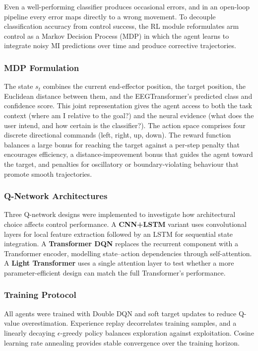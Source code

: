 \documentclass[12pt, a4paper]{article}
\begin{document}
Even a well-performing classifier produces occasional errors, and in an open-loop pipeline every error maps directly to a wrong movement. To decouple classification accuracy from control success, the RL module reformulates arm control as a Markov Decision Process (MDP) in which the agent learns to integrate noisy MI predictions over time and produce corrective trajectories.

\subsubsection{MDP Formulation}

The state $s_t$ combines the current end-effector position, the target position, the Euclidean distance between them, and the EEGTransformer's predicted class and confidence score. This joint representation gives the agent access to both the task context (where am I relative to the goal?) and the neural evidence (what does the user intend, and how certain is the classifier?). The action space comprises four discrete directional commands (left, right, up, down). The reward function balances a large bonus for reaching the target against a per-step penalty that encourages efficiency, a distance-improvement bonus that guides the agent toward the target, and penalties for oscillatory or boundary-violating behaviour that promote smooth trajectories.

\subsubsection{Q-Network Architectures}

Three Q-network designs were implemented to investigate how architectural choice affects control performance. A \textbf{CNN+LSTM} variant uses convolutional layers for local feature extraction followed by an LSTM for sequential state integration. A \textbf{Transformer DQN} replaces the recurrent component with a Transformer encoder, modelling state--action dependencies through self-attention. A \textbf{Light Transformer} uses a single attention layer to test whether a more parameter-efficient design can match the full Transformer's performance.

\subsubsection{Training Protocol}

All agents were trained with Double DQN and soft target updates to reduce Q-value overestimation. Experience replay decorrelates training samples, and a linearly decaying $\epsilon$-greedy policy balances exploration against exploitation. Cosine learning rate annealing provides stable convergence over the training horizon.
\end{document}
